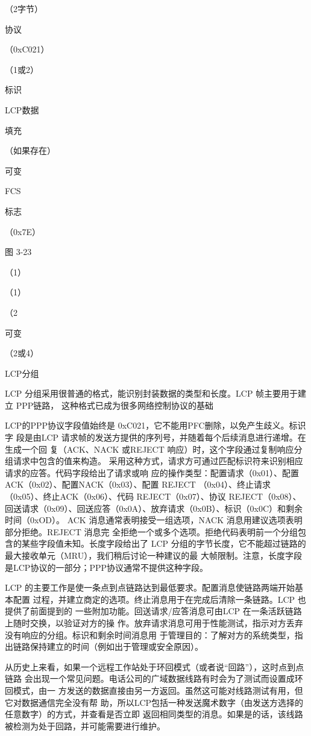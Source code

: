 （2字节）

协议

（0xC021）

（1或2）

标识

LCP数据

填充

（如果存在）

可变

FCS

标志

（0x7E）

图 3-23

（1）

（1）

（2

可变

（2或4）

LCP分组

LCP 分组采用很普通的格式，能识别封装数据的类型和长度。LCP 帧主要用于建立 PPP链路，
这种格式已成为很多网络控制协议的基础

LCP的PPP协议字段值始终是 0xC021，它不能用PFC删除，以免产生歧义。标识字
段是由LCP 请求帧的发送方提供的序列号，并随着每个后续消息进行递增。在生成一个回
复（ACK、NACK 或REJECT 响应）时，这个字段通过复制响应分组请求中包含的值来构造。
采用这种方式，请求方可通过匹配标识符来识别相应请求的应答。代码字段给出了请求或响
应的操作类型：配置请求（0x01）、配置ACK（0x02）、配置NACK（0x03）、配置 REJECT
（0x04）、终止请求（0x05）、终止ACK（0x06）、代码 REJECT（0x07）、协议 REJECT（0x08）、
回送请求（0x09）、回送应答（0x0A）、放弃请求（0x0B）、标识（0x0C）和剩余时间（0xOD）。
ACK 消息通常表明接受一组选项，NACK 消息用建议选项表明部分拒绝。REJECT 消息完
全拒绝一个或多个选项。拒绝代码表明前一个分组包含的某些字段值未知。长度字段给出了
LCP 分组的字节长度，它不能超过链路的最大接收单元（MRU），我们稍后讨论一种建议的最
大帧限制。注意，长度字段是LCP协议的一部分；PPP协议通常不提供这种字段。

LCP 的主要工作是使一条点到点链路达到最低要求。配置消息使链路两端开始基本配置
过程，并建立商定的选项。终止消息用于在完成后清除一条链路。LCP 也提供了前面提到的
一些附加功能。回送请求/应答消息可由LCP 在一条活跃链路上随时交换，以验证对方的操
作。放弃请求消息可用于性能测试，指示对方丢弃没有响应的分组。标识和剩余时间消息用
于管理目的：了解对方的系统类型，指出链路保持建立的时间（例如出于管理或安全原因）。

从历史上来看，如果一个远程工作站处于环回模式（或者说“回路”），这时点到点链路
会出现一个常见问题。电话公司的广域数据线路有时会为了测试而设置成环回模式，由一
方发送的数据直接由另一方返回。虽然这可能对线路测试有用，但它对数据通信完全没有帮
助，所以LCP包括一种发送魔术数字（由发送方选择的任意数字）的方式，并查看是否立即
返回相同类型的消息。如果是的话，该线路被检测为处于回路，并可能需要进行维护。

